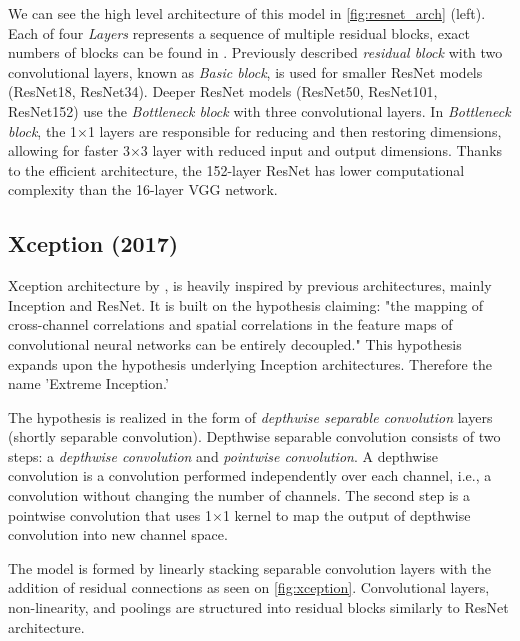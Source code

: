 We can see the high level architecture of this model in \cref{fig:resnet_arch} (left). Each of four \textit{Layers} represents a sequence of multiple residual blocks, exact numbers of blocks can be found in \cite[table 1]{bib:resnet}. Previously described \textit{residual block} with two convolutional layers, known as \textit{Basic block}, is used for smaller ResNet models (ResNet18, ResNet34). Deeper ResNet models (ResNet50, ResNet101, ResNet152) use the \textit{Bottleneck block} with three convolutional layers. In \textit{Bottleneck block}, the 1$\times$1 layers are responsible for reducing and then restoring dimensions, allowing for faster 3$\times$3 layer with reduced input and output dimensions. Thanks to the efficient architecture, the 152-layer ResNet has lower computational complexity than the 16-layer VGG network.



\subsection{Xception (2017)}
\label{sec:xception} Xception architecture by \citeauthor{bib:xception} \cite{bib:xception}, is heavily inspired by previous architectures, mainly Inception and ResNet. It is built on the hypothesis claiming: "the mapping of cross-channel correlations and spatial correlations in the feature maps of convolutional neural networks can be entirely decoupled." This hypothesis expands upon the hypothesis underlying Inception architectures. Therefore the name 'Extreme Inception.' 

The hypothesis is realized in the form of \textit{depthwise separable convolution} layers (shortly separable convolution). Depthwise separable convolution consists of two steps: a \textit{depthwise convolution} and \textit{pointwise convolution}. A depthwise convolution is a convolution performed independently over each channel, i.e., a convolution without changing the number of channels. The second step is a pointwise convolution that uses 1$\times$1 kernel to map the output of depthwise convolution into new channel space.

The model is formed by linearly stacking separable convolution layers with the addition of residual connections as seen on \cref{fig:xception}. Convolutional layers, non-linearity, and poolings are structured into residual blocks similarly to ResNet architecture.

